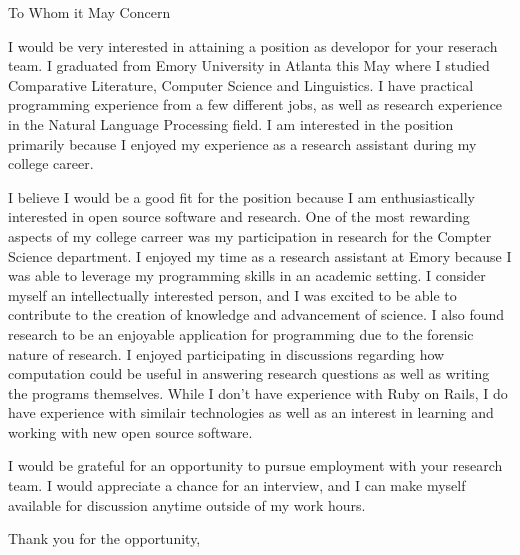 
\signature{Walter Askew\\
  2065 N Hoyne Ave Apt 2R\\
  Chicago, IL 60647}

\begin{letter}{To Whom it May Concern}

\opening{}

   I would be very interested in attaining a position as developor for
   your reserach team. 
  I graduated from Emory University in Atlanta this May where I
  studied Comparative Literature, Computer Science and Linguistics.
  I have practical programming experience from a few different jobs,
  as well as research experience in the Natural Language Processing
  field.
  I am interested in the position primarily because I enjoyed my
  experience as a research assistant during my college career.

  I believe I would be a good fit for the position because I am
  enthusiastically interested in open source software and research.
  One of the most rewarding aspects of my college carreer was my
  participation in research for the Compter Science department.
  I enjoyed my time as a research assistant at Emory because I was able to
  leverage my programming skills in an academic setting.
  I consider myself an intellectually interested person, and I was
  excited to be able to contribute to the creation of knowledge and
  advancement of science.
  I also found research to be an enjoyable application for programming
  due to the forensic nature of research.
  I enjoyed participating in discussions
  regarding how computation could be useful in answering research
  questions as well as writing the programs themselves.
  While I don't have experience with Ruby on Rails, I do have
  experience with similair technologies as well as an interest in
  learning and working with new open source software.

  I would be grateful for an opportunity to pursue employment with
  your research team.
  I would appreciate a chance for an interview, and I can make myself
  available for discussion anytime outside of my work hours.


  \closing{Thank you for the opportunity,}
\end{letter}
